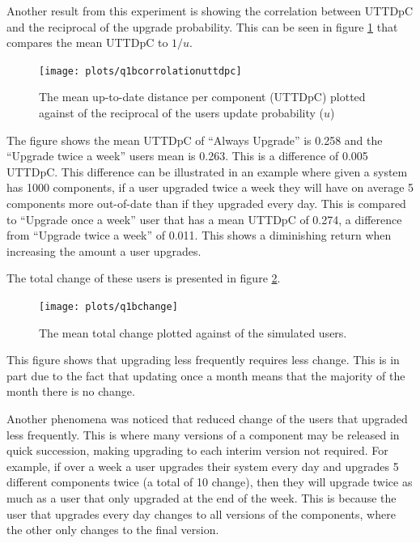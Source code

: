 Another result from this experiment is showing the correlation between UTTDpC and the reciprocal of the upgrade probability.
This can be seen in figure \ref{exp.q1bcorrolationuttdpc} that compares the mean UTTDpC to $1/u$.

\begin{figure}[htp]
\begin{center}
  \texttt{[image: plots/q1bcorrolationuttdpc]}
  \caption{The mean up-to-date distance per component (UTTDpC) plotted against of the reciprocal of the users update probability ($u$)}
  \label{exp.q1bcorrolationuttdpc}
\end{center}
\end{figure}

The figure shows the mean UTTDpC of ``Always Upgrade'' is 0.258 and the ``Upgrade twice a week'' users mean is 0.263.
This is a difference of 0.005 UTTDpC.
This difference can be illustrated in an example where given a system has 1000 components, 
if a user upgraded twice a week they will have on average 5 components more out-of-date than if they upgraded every day. 
This is compared to ``Upgrade once a week'' user that has a mean UTTDpC of 0.274, a difference from ``Upgrade twice a week'' of 0.011.
This shows a diminishing return when increasing the amount a user upgrades.

The total change of these users is presented in figure \ref{exp.q1bchange}.

\begin{figure}[htp]
\begin{center}
  \texttt{[image: plots/q1bchange]}
  \caption{The mean total change plotted against of the simulated users.}
  \label{exp.q1bchange}
\end{center}
\end{figure}

This figure shows that upgrading less frequently requires less change. 
This is in part due to the fact that updating once a month means that the majority of the month there is no change.

Another phenomena was noticed that reduced change of the users that upgraded less frequently.
This is where many versions of a component may be released in quick succession, making upgrading to each interim version not required.
For example, if over a week a user upgrades their system every day and upgrades 5 different components twice (a total of 10 change), 
then they will upgrade twice as much as a user that only upgraded at the end of the week.
This is because the user that upgrades every day changes to all versions of the components, where the other only changes to the final version.

